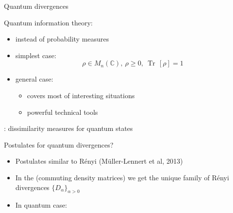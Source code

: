 \documentclass[mathserif]{beamer}
\newcommand{\<}{\langle}
\renewcommand{\>}{\rangle}
\newcommand{\Tr}{\operatorname{Tr}\,}
\begin{document}
\begin{frame}{Quantum divergences}


Quantum information theory:  

\medskip
\begin{itemize}
\item {} instead of probability measures
\vskip 2mm
\item simplest case: 
\[
\rho\in M_n(\mathbb C),\ \rho\ge 0,\ \Tr[\rho]=1
\]
\item general case: 
\vskip 2mm
\begin{itemize}
\item covers most of interesting situations
\vskip 2mm
\item powerful technical tools

\end{itemize}

\end{itemize}

\medskip

: dissimilarity measures for quantum states

\end{frame}

\begin{frame}{Postulates for quantum divergences?}

\begin{itemize}
\item Postulates similar to R\'enyi {\small (M\"uller-Lennert et al, 2013)}
\vskip 5mm

\item In the   (commuting density matrices) we get 
the unique family of R\'enyi divergences
$\{D_\alpha\}_{\alpha>0}$

\vskip 5mm
\item In  quantum case: 


\end{itemize}


\end{frame}
\end{document}
